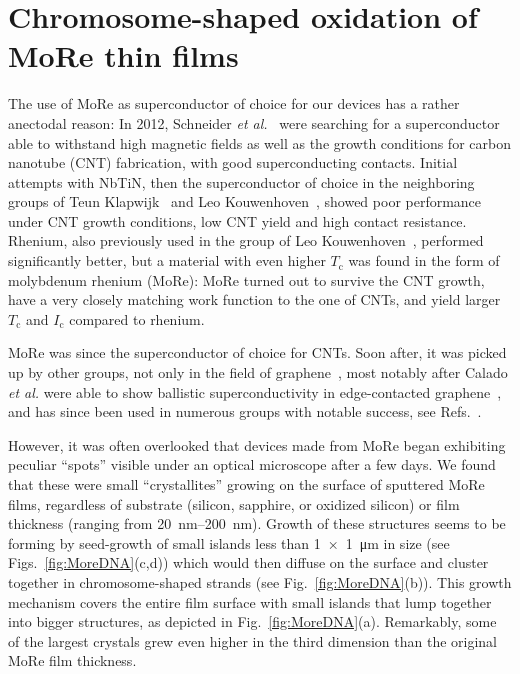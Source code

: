 \section{Chromosome-shaped oxidation of MoRe thin films}
\label{sec:more}

The use of MoRe as superconductor of choice for our devices has a rather anectodal reason:
%
In 2012, Schneider \textit{et al.}~\cite{schneiderCouplingCarbonNanotube2012,schneiderSuspendedCarbonNanotubes2014b} were searching for a superconductor able to withstand high magnetic fields as well as the growth conditions for carbon nanotube (CNT) fabrication, with good superconducting contacts.
%
Initial attempts with NbTiN, then the superconductor of choice in the neighboring groups of Teun Klapwijk~\cite{iosadSourceOptimizationMagnetron1999} and Leo Kouwenhoven~\cite{mourikSignaturesMajoranaFermions2012}, showed poor performance under CNT growth conditions, low CNT yield and high contact resistance.
%
Rhenium, also previously used in the group of Leo Kouwenhoven~\cite{keijzersJosephsonEffectsCarbon2012}, performed significantly better, but a material with even higher $T_\text{c}$ was found in the form of molybdenum rhenium (MoRe):
%
MoRe turned out to survive the CNT growth, have a very closely matching work function to the one of CNTs, and yield larger $T_\text{c}$ and $I_\text{c}$ compared to rhenium.

MoRe was since the superconductor of choice for CNTs.
%
Soon after, it was picked up by other groups, not only in the field of graphene~\cite{azizMolybdenumrheniumSuperconductingSuspended2014a}, most notably after Calado \textit{et al.} were able to show ballistic superconductivity in edge-contacted graphene~\cite{caladoBallisticJosephsonJunctions2015d}, and has since been used in numerous groups with notable success, see Refs.~\cite{singhMolybdenumrheniumAlloyBased2014,gotzCosputteredMoReThin2016,blienCarbonNanotubeGrowth2016a,draelosSupercurrentFlowMultiterminal2019,ametSupercurrentQuantumHall2016b,islandThicknessDependentInterlayer2016a,krollMagneticFieldCompatible2018}.


However, it was often overlooked that devices made from MoRe began exhibiting peculiar \enquote{spots} visible under an optical microscope after a few days.
% 
We found that these were small \enquote{crystallites} growing on the surface of sputtered MoRe films, regardless of substrate (silicon, sapphire, or oxidized silicon) or film thickness (ranging from \SIrange{20}{200}{\nano\meter}).
%
Growth of these structures seems to be forming by seed-growth of small islands less than \SI{1x1}{\micro\meter} in size (see Figs.~\ref{fig:MoreDNA}(c,d)) which would then diffuse on the surface and cluster together in chromosome-shaped strands (see Fig.~\ref{fig:MoreDNA}(b)).
%
This growth mechanism covers the entire film surface with small islands that lump together into bigger structures, as depicted in Fig.~\ref{fig:MoreDNA}(a).
%
Remarkably, some of the largest crystals grew even higher in the third dimension than the original MoRe film thickness.

